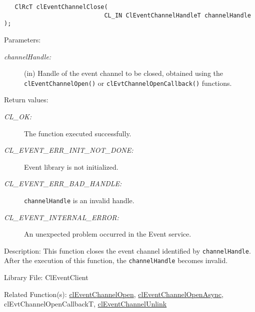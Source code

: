 \begin{flushleft}
\begin{Desc}
\footnotesize\begin{verbatim}   ClRcT clEventChannelClose(
              				CL_IN ClEventChannelHandleT channelHandle );
\end{verbatim}
\normalsize
\end{Desc}
\begin{Desc}
\item[Parameters:]
\begin{description}
\item[{\em channel\-Handle:}](in) Handle of the event channel to be closed, obtained using the 
{\tt{clEventChannelOpen()}} or {\tt{clEvtChannelOpenCallback()}} functions.
\end{description}
\end{Desc}
\begin{Desc}
\item[Return values:]
\begin{description}
\item[{\em CL\_\-OK:}]The function executed successfully. 
\item[{\em CL\_\-EVENT\_\-ERR\_\-INIT\_\-NOT\_\-DONE:}]Event library is not initialized. 
\item[{\em CL\_\-EVENT\_\-ERR\_\-BAD\_\-HANDLE:}]{\tt{channelHandle}} is an invalid handle. 
\item[{\em CL\_\-EVENT\_\-INTERNAL\_\-ERROR:}]An unexpected problem occurred in the Event service.
\end{description}
\end{Desc}
\begin{Desc}
\item[Description:]
This function closes the event channel identified by {\tt{channelHandle}}. After the execution of this function, the {\tt{channelHandle}} becomes invalid.
\end{Desc}
\begin{Desc}
\item[Library File:]Cl\-Event\-Client\end{Desc}
\begin{Desc}
\item[Related Function(s):]\hyperlink{pageem103}{cl\-Event\-Channel\-Open}, \hyperlink{pageem104}{cl\-Event\-Channel\-Open\-Async}, 
cl\-Evt\-Channel\-Open\-Callback\-T, \hyperlink{pageem106}{cl\-Event\-Channel\-Unlink} \end{Desc}
\newpage



\end{flushleft}
